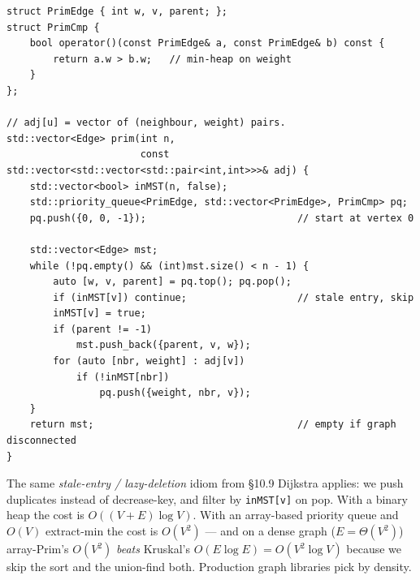 \documentclass[11pt]{article}
\begin{document}
\begin{lstlisting}[basicstyle=\ttfamily\small,frame=single]
struct PrimEdge { int w, v, parent; };
struct PrimCmp {
    bool operator()(const PrimEdge& a, const PrimEdge& b) const {
        return a.w > b.w;   // min-heap on weight
    }
};

// adj[u] = vector of (neighbour, weight) pairs.
std::vector<Edge> prim(int n,
                       const std::vector<std::vector<std::pair<int,int>>>& adj) {
    std::vector<bool> inMST(n, false);
    std::priority_queue<PrimEdge, std::vector<PrimEdge>, PrimCmp> pq;
    pq.push({0, 0, -1});                          // start at vertex 0

    std::vector<Edge> mst;
    while (!pq.empty() && (int)mst.size() < n - 1) {
        auto [w, v, parent] = pq.top(); pq.pop();
        if (inMST[v]) continue;                   // stale entry, skip
        inMST[v] = true;
        if (parent != -1)
            mst.push_back({parent, v, w});
        for (auto [nbr, weight] : adj[v])
            if (!inMST[nbr])
                pq.push({weight, nbr, v});
    }
    return mst;                                   // empty if graph disconnected
}
\end{lstlisting}

The same \emph{stale-entry / lazy-deletion} idiom from \S10.9
Dijkstra applies: we push duplicates instead of decrease-key, and
filter by \texttt{inMST[v]} on pop. With a binary heap the cost is
$O((V + E) \log V)$. With an array-based priority queue and
$O(V)$ extract-min the cost is $O(V^2)$ --- and on a dense graph
($E = \Theta(V^2)$) array-Prim's $O(V^2)$ \emph{beats} Kruskal's
$O(E \log E) = O(V^2 \log V)$ because we skip the sort and the
union-find both. Production graph libraries pick by density.

\begin{center}
\end{center}
\end{document}
